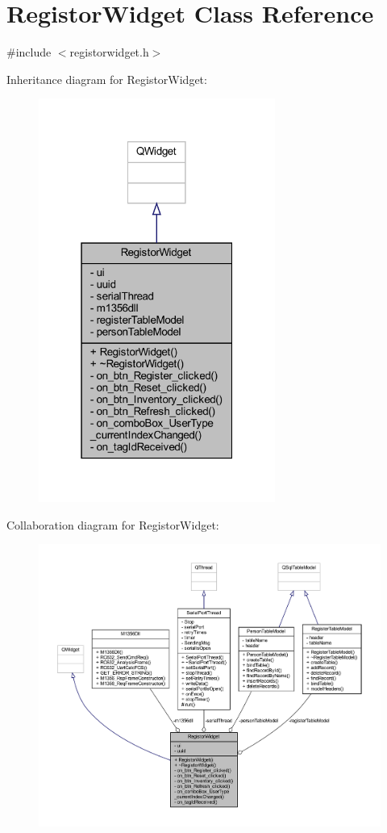 \hypertarget{class_registor_widget}{}\section{Registor\+Widget Class Reference}
\label{class_registor_widget}


{\ttfamily \#include $<$registorwidget.\+h$>$}



Inheritance diagram for Registor\+Widget\+:
\nopagebreak
\begin{figure}[H]
\begin{center}
\leavevmode
\includegraphics[width=220pt]{class_registor_widget__inherit__graph}
\end{center}
\end{figure}


Collaboration diagram for Registor\+Widget\+:
\nopagebreak
\begin{figure}[H]
\begin{center}
\leavevmode
\includegraphics[width=350pt]{class_registor_widget__coll__graph}
\end{center}
\end{figure}
